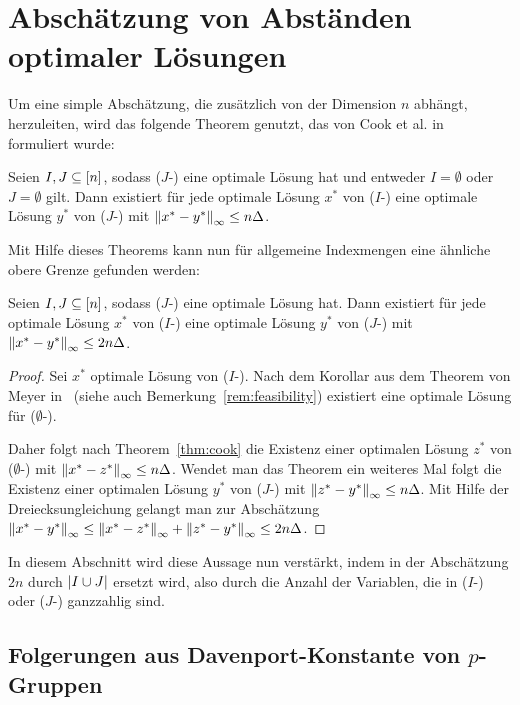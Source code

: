 \section{Abschätzung von Abständen optimaler Lösungen}

Um eine simple Abschätzung, die zusätzlich von der Dimension $n$ abhängt, herzuleiten, wird das folgende Theorem genutzt, das von Cook et al. in~\cite[Theorem 1 und Bemerkung 1]{Cook1986} formuliert wurde:

\begin{theorem}[Cook et al., 1986]\label{thm:cook}
	Seien $I, J\subseteq[n]$, sodass ($J$-\MIPR) eine optimale Lösung hat und entweder $I=\emptyset$ oder $J=\emptyset$ gilt.
	Dann existiert für jede optimale Lösung $x^*$ von ($I$-\MIPR) eine optimale Lösung $y^*$ von ($J$-\MIPR) mit $\left\lVert x^*-y^*\right\rVert_\infty\leq n\Delta$.
\end{theorem}

Mit Hilfe dieses Theorems kann nun für allgemeine Indexmengen eine ähnliche obere Grenze gefunden werden:
\begin{corollary}
	Seien $I,J\subseteq[n]$, sodass ($J$-\MIPR) eine optimale Lösung
	hat.
	Dann existiert für jede optimale Lösung $x^*$ von ($I$-\MIPR) eine optimale Lösung $y^*$ von ($J$-\MIPR) mit $\left\lVert x^*-y^*\right\rVert_\infty\leq2 n\Delta$.
\end{corollary}
\begin{proof}
	Sei $x^*$ optimale Lösung von ($I$-\MIPR).
	Nach dem Korollar aus dem Theorem von Meyer in~\cite[Korollar 5.2]{Meyer1974} (siehe auch Bemerkung~\ref{rem:feasibility}) existiert eine optimale Lösung für ($\emptyset$-\MIPR).
	
	Daher folgt nach Theorem~\ref{thm:cook} die Existenz einer optimalen Lösung $z^*$ von ($\emptyset$-\MIPR) mit $\left\lVert x^*-z^*\right\rVert_\infty\leq n\Delta$.
	Wendet man das Theorem ein weiteres Mal folgt die Existenz einer optimalen Lösung $y^*$ von \mbox{($J$-\MIPR)} mit $\left\lVert z^*-y^*\right\rVert_\infty\leq n\Delta$.
	Mit Hilfe der Dreiecksungleichung gelangt man zur Abschätzung $\left\lVert x^*-y^*\right\rVert_\infty\leq\left\lVert x^*-z^*\right\rVert_\infty+\left\lVert z^*-y^*\right\rVert_\infty\leq 2 n\Delta$.
\end{proof}

In diesem Abschnitt wird diese Aussage nun verstärkt, indem in der Abschätzung $2 n$ durch $\lvert I\cup J \rvert$ ersetzt wird, also durch die Anzahl der Variablen, die in ($I$-\MIPR) oder \mbox{($J$-\MIPR)} ganzzahlig sind.

\subsection{Folgerungen aus Davenport-Konstante von $p$-Gruppen}

